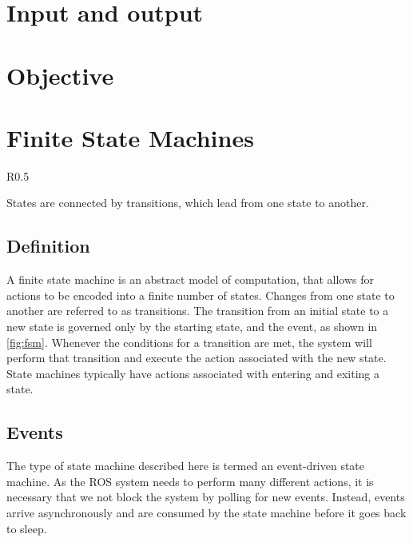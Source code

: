 \documentclass[\rootfolder/main.tex]{subfiles}
\begin{document}
\section{Input and output}

\section{Objective}



\section{Finite State Machines}

\begin{wrapfigure}{R}{0.5\columnwidth}
    \caption{An example of a simple state machine.}
    \label{fig:fsm}
\end{wrapfigure}

States are connected by transitions, which lead from one state to another.

\subsection{Definition}

A finite state machine is an abstract model of computation, that allows for actions to be encoded into a finite number of states.
Changes from one state to another are referred to as transitions.
The transition from an initial state to a new state is governed only by the starting state, and the event, as shown in \cref{fig:fsm}.
Whenever the conditions for a transition are met, the system will perform that transition and execute the action associated with the new state.
State machines typically have actions associated with entering and exiting a state.

\subsection{Events}

The type of state machine described here is termed an event-driven state machine.
As the ROS system needs to perform many different actions, it is necessary that we not block the system by polling for new events.
Instead, events arrive asynchronously and are consumed by the state machine before it goes back to sleep.
\end{document}
